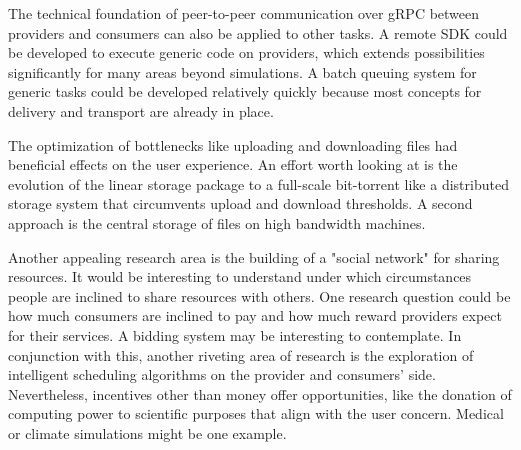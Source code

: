 The technical foundation of peer-to-peer communication over gRPC between providers and consumers can also be applied to other tasks. A remote SDK could be developed to execute generic code on providers, which extends possibilities significantly for many areas beyond simulations. A batch queuing system for generic tasks could be developed relatively quickly because most concepts for delivery and transport are already in place.

The optimization of bottlenecks like uploading and downloading files had beneficial effects on the user experience. An effort worth looking at is the evolution of the linear storage package to a full-scale bit-torrent like a distributed storage system that circumvents upload and download thresholds. A second approach is the central storage of files on high bandwidth machines.

Another appealing research area is the building of a "social network" for sharing resources. It would be interesting to understand under which circumstances people are inclined to share resources with others. One research question could be how much consumers are inclined to pay and how much reward providers expect for their services. A bidding system may be interesting to contemplate. In conjunction with this, another riveting area of research is the exploration of intelligent scheduling algorithms on the provider and consumers' side. Nevertheless, incentives other than money offer opportunities, like the donation of computing power to scientific purposes that align with the user concern. Medical or climate simulations might be one example.
